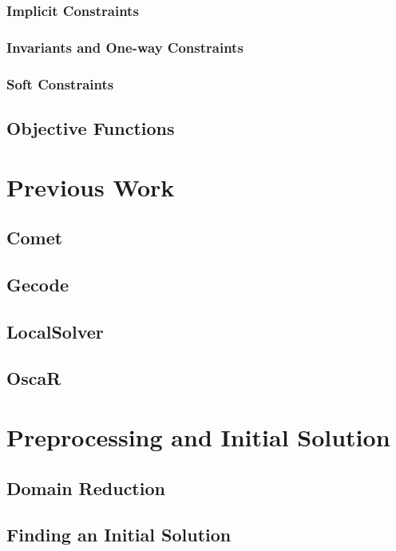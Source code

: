 \documentclass[a4paper,12pt]{article}
\begin{document}
    \subsubsection{Implicit Constraints}
    
    \subsubsection{Invariants and One-way Constraints}
    
    \subsubsection{Soft Constraints}
    
  \subsection{Objective Functions}
  

\section{Previous Work}
  \subsection{Comet}
  \subsection{Gecode}
  \subsection{LocalSolver}
  \subsection{OscaR}
  
\section{Preprocessing and Initial Solution}
  \subsection{Domain Reduction}
  
  \subsection{Finding an Initial Solution}
  
\end{document}
